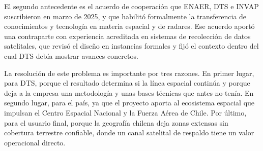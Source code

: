 El segundo antecedente es el acuerdo de cooperación que ENAER, DTS e INVAP suscribieron en marzo de 2025, y que habilitó formalmente la transferencia de conocimientos y tecnología en materia espacial y de radares. Ese acuerdo aportó una contraparte con experiencia acreditada en sistemas de recolección de datos satelitales, que revisó el diseño en instancias formales y fijó el contexto dentro del cual DTS debía mostrar avances concretos.

La resolución de este problema es importante por tres razones. En primer lugar, para DTS, porque el resultado determina si la línea espacial continúa y porque deja a la empresa una metodología y unas bases técnicas que antes no tenía. En segundo lugar, para el país, ya que el proyecto aporta al ecosistema espacial que impulsan el Centro Espacial Nacional y la Fuerza Aérea de Chile. Por último, para el usuario final, porque la geografía chilena deja zonas extensas sin cobertura terrestre confiable, donde un canal satelital de respaldo tiene un valor operacional directo.
